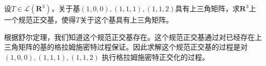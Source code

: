 \documentclass[10pt,a4paper,UTF8]{article}
\begin{document}
\begin{tikzproblem}
设\(T\in \mathcal{L}(\mathbf{R}^{3})\)，关于基\((1,0,0),(1,1,1),(1,1,2)\)具有上三角矩阵，求\(\mathbf{R}^{3}\)上一个规范正交基，使得\(T\)关于这个基具有上三角矩阵。
\end{tikzproblem}

\begin{tikzanswer}
根据舒尔定理，我们知道这个规范正交基存在。这个规范正交基通过对已经存在上三角矩阵的基的格拉姆施密特过程保证。因此求解这个规范正交基的过程是对\((1,0,0),(1,1,1),(1,1,2)\) 执行格拉姆施密特正交化的过程。
\end{tikzanswer}
\end{document}
